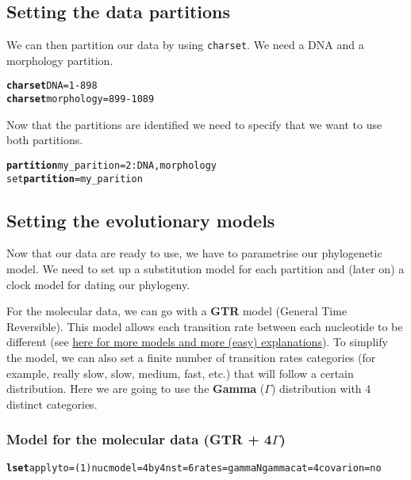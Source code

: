 \documentclass{article}\usepackage[]{graphicx}\usepackage[]{color}
\makeatletter
\newcommand{\hlstr}[1]{\textcolor[rgb]{0.192,0.494,0.8}{#1}}%
\newcommand{\hlkwd}[1]{\textcolor[rgb]{0.737,0.353,0.396}{\textbf{#1}}}%
\newenvironment{kframe}{%
 \def\at@end@of@kframe{}%
 \ifinner\ifhmode%
  \def\at@end@of@kframe{\end{minipage}}%
  \begin{minipage}{\columnwidth}%
 \fi\fi%
 \def\FrameCommand##1{\hskip\@totalleftmargin \hskip-\fboxsep
 \colorbox{shadecolor}{##1}\hskip-\fboxsep
     \hskip-\linewidth \hskip-\@totalleftmargin \hskip\columnwidth}%
 \MakeFramed {\advance\hsize-\width
   \@totalleftmargin\z@ \linewidth\hsize
   \@setminipage}}%
 {\par\unskip\endMakeFramed%
 \at@end@of@kframe}
\newenvironment{knitrout}{}{} %
\makeatother
\begin{document}
\subsection{Setting the data partitions}
We can then partition our data by using \texttt{charset}.
We need a DNA and a morphology partition.

\begin{knitrout}
\color{fgcolor}\begin{kframe}
\begin{alltt}
\hlkwd{charset} \hlstr{DNA}=\hlstr{1-898}
\hlkwd{charset} \hlstr{morphology}=\hlstr{899-1089}
\end{alltt}
\end{kframe}
\end{knitrout}

\indent Now that the partitions are identified we need to specify that we want to use both partitions.
\begin{knitrout}
\color{fgcolor}\begin{kframe}
\begin{alltt}
\hlkwd{partition} \hlstr{my_parition}=\hlstr{2}: \hlstr{DNA}, \hlstr{morphology}
set \hlkwd{partition}=\hlstr{my_parition}
\end{alltt}
\end{kframe}
\end{knitrout}

\subsection{Setting the evolutionary models}
Now that our data are ready to use, we have to parametrise our phylogenetic model.
We need to set up a substitution model for each partition and (later on) a clock model for dating our phylogeny.


For the molecular data, we can go with a \textbf{GTR} model (General Time Reversible).
This model allows each transition rate between each nucleotide to be different (see \href{https://en.wikipedia.org/wiki/Models_of_DNA_evolution}{here for more models and more (easy) explanations}).
To simplify the model, we can also set a finite number of transition rates categories (for example, really slow, slow, medium, fast, etc.) that will follow a certain distribution.
Here we are going to use the \textbf{Gamma} ($\Gamma$) distribution with 4 distinct categories.

\subsubsection*{Model for the molecular data (GTR + 4$\Gamma$)}
\begin{knitrout}
\color{fgcolor}\begin{kframe}
\begin{alltt}
\hlkwd{lset} applyto=\hlstr{(1)} nucmodel=\hlstr{4by4} nst=\hlstr{6} rates=\hlstr{gamma} Ngammacat=\hlstr{4} covarion=\hlstr{no}
\end{alltt}
\end{kframe}
\end{knitrout}
\end{document}
